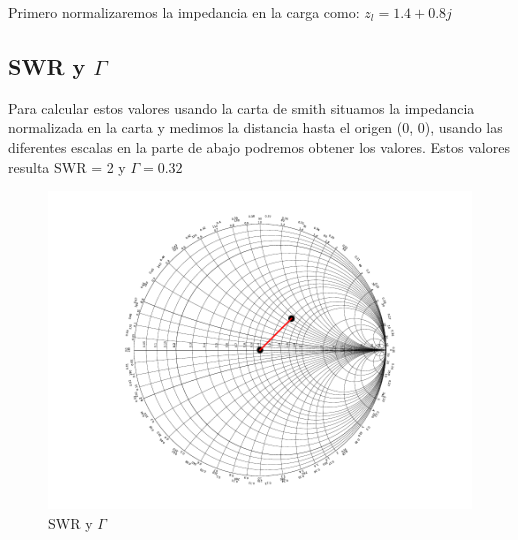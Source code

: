 Primero normalizaremos la impedancia en la carga como: $z_l = 1.4 + 0.8j$
\subsection{SWR y $\Gamma$}
Para calcular estos valores usando la carta de smith situamos la impedancia normalizada en la carta y medimos la distancia hasta el origen (0, 0),  usando las diferentes escalas en la parte de abajo podremos obtener los valores.
Estos valores resulta SWR = 2 y $\Gamma = 0.32$
\begin{figure}[h]
  \centering
  \includegraphics{ej7/images/out1.pdf}
  \caption{SWR y $\Gamma$}
  \label{ej2smith}
\end{figure}
\newpage
